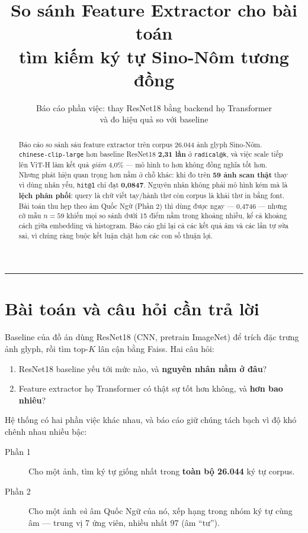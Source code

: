 \documentclass[11pt,a4paper]{article}
\title{\textbf{So sánh Feature Extractor cho bài toán\\
tìm kiếm ký tự Sino-Nôm tương đồng}}
\author{Báo cáo phần việc: thay ResNet18 bằng backend họ Transformer\\
và đo hiệu quả so với baseline}
\date{}
\newcommand{\code}[1]{\texttt{#1}}
\begin{document}
\maketitle

\begin{abstract}
\noindent
Báo cáo so sánh sáu feature extractor trên corpus 26.044 ảnh glyph Sino-Nôm.
\code{chinese-clip-large} hơn baseline ResNet18 \textbf{2,31 lần} ở \code{radical@k}, và việc
scale tiếp lên ViT-H làm kết quả \emph{giảm} 4,0\% --- mô hình to hơn không đồng nghĩa tốt hơn.
Nhưng phát hiện quan trọng hơn nằm ở chỗ khác: khi đo trên \textbf{59 ảnh scan thật} thay vì dùng
nhãn yếu, \code{hit@1} chỉ đạt \textbf{0,0847}. Nguyên nhân không phải mô hình kém mà là
\textbf{lệch phân phối}: query là chữ viết tay/hành thư còn corpus là khải thư in bằng font.
Bài toán thu hẹp theo âm Quốc Ngữ (Phần 2) thì dùng được ngay --- 0,4746 --- nhưng cỡ mẫu
$n = 59$ khiến mọi so sánh dưới 15 điểm nằm trong khoảng nhiễu, kể cả khoảng cách giữa embedding
và histogram. Báo cáo ghi lại cả các kết quả âm và các lần tự sửa sai, vì chúng ràng buộc kết luận
chặt hơn các con số thuận lợi.
\end{abstract}

\tableofcontents
\bigskip
\hrule

\section{Bài toán và câu hỏi cần trả lời}

Baseline của đồ án dùng ResNet18 (CNN, pretrain ImageNet) để trích đặc trưng ảnh glyph, rồi tìm
top-$K$ lân cận bằng Faiss. Hai câu hỏi:

\begin{enumerate}
  \item ResNet18 baseline yếu tới mức nào, và \textbf{nguyên nhân nằm ở đâu}?
  \item Feature extractor họ Transformer có thật sự tốt hơn không, và \textbf{hơn bao nhiêu}?
\end{enumerate}

Hệ thống có hai phần việc khác nhau, và báo cáo giữ chúng tách bạch vì độ khó chênh nhau nhiều bậc:

\begin{description}
  \item[Phần 1] Cho một ảnh, tìm ký tự giống nhất trong \textbf{toàn bộ 26.044} ký tự corpus.
  \item[Phần 2] Cho một ảnh \emph{và} âm Quốc Ngữ của nó, xếp hạng trong nhóm ký tự cùng âm ---
        trung vị 7 ứng viên, nhiều nhất 97 (âm ``tư'').
\end{description}
\end{document}
